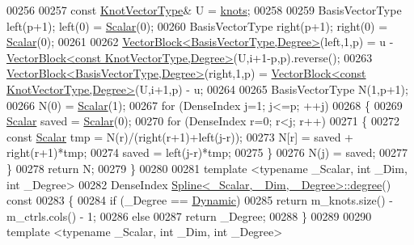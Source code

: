 \begin{DoxyCode}
00256 
00257     \textcolor{keyword}{const} \hyperlink{group___splines___module_a066f7a8b120316c9068b559f0790e9ec}{KnotVectorType}& U = \hyperlink{group___splines___module_ae3eac8af580ad880d8ad3a259d453aa1}{knots};
00258 
00259     BasisVectorType left(p+1); left(0) = \hyperlink{group___splines___module_a8cafd78b564825c76fbb3419653d9742}{Scalar}(0);
00260     BasisVectorType right(p+1); right(0) = \hyperlink{group___splines___module_a8cafd78b564825c76fbb3419653d9742}{Scalar}(0);        
00261 
00262     \hyperlink{group___core___module_class_eigen_1_1_vector_block}{VectorBlock<BasisVectorType,Degree>}(left,1,p) = u - 
      \hyperlink{group___core___module_class_eigen_1_1_vector_block}{VectorBlock<const KnotVectorType,Degree>}(U,i+1-p,p).reverse();
00263     \hyperlink{group___core___module_class_eigen_1_1_vector_block}{VectorBlock<BasisVectorType,Degree>}(right,1,p) = 
      \hyperlink{group___core___module_class_eigen_1_1_vector_block}{VectorBlock<const KnotVectorType,Degree>}(U,i+1,p) - u;
00264 
00265     BasisVectorType N(1,p+1);
00266     N(0) = \hyperlink{group___splines___module_a8cafd78b564825c76fbb3419653d9742}{Scalar}(1);
00267     \textcolor{keywordflow}{for} (DenseIndex j=1; j<=p; ++j)
00268     \{
00269       \hyperlink{group___splines___module_a8cafd78b564825c76fbb3419653d9742}{Scalar} saved = \hyperlink{group___splines___module_a8cafd78b564825c76fbb3419653d9742}{Scalar}(0);
00270       \textcolor{keywordflow}{for} (DenseIndex r=0; r<j; r++)
00271       \{
00272         \textcolor{keyword}{const} \hyperlink{group___splines___module_a8cafd78b564825c76fbb3419653d9742}{Scalar} tmp = N(r)/(right(r+1)+left(j-r));
00273         N[r] = saved + right(r+1)*tmp;
00274         saved = left(j-r)*tmp;
00275       \}
00276       N(j) = saved;
00277     \}
00278     \textcolor{keywordflow}{return} N;
00279   \}
00280 
00281   \textcolor{keyword}{template} <\textcolor{keyword}{typename} \_Scalar, \textcolor{keywordtype}{int} \_Dim, \textcolor{keywordtype}{int} \_Degree>
00282   DenseIndex \hyperlink{group___splines___module_a0df23e941ac0f31dcd095a4dd4f4a7ec}{Spline<\_Scalar, \_Dim, \_Degree>::degree}()\textcolor{keyword}{ const}
00283 \textcolor{keyword}{  }\{
00284     \textcolor{keywordflow}{if} (\_Degree == \hyperlink{namespace_eigen_ad81fa7195215a0ce30017dfac309f0b2}{Dynamic})
00285       \textcolor{keywordflow}{return} m\_knots.size() - m\_ctrls.cols() - 1;
00286     \textcolor{keywordflow}{else}
00287       \textcolor{keywordflow}{return} \_Degree;
00288   \}
00289 
00290   \textcolor{keyword}{template} <\textcolor{keyword}{typename} \_Scalar, \textcolor{keywordtype}{int} \_Dim, \textcolor{keywordtype}{int} \_Degree>

\end{DoxyCode}
